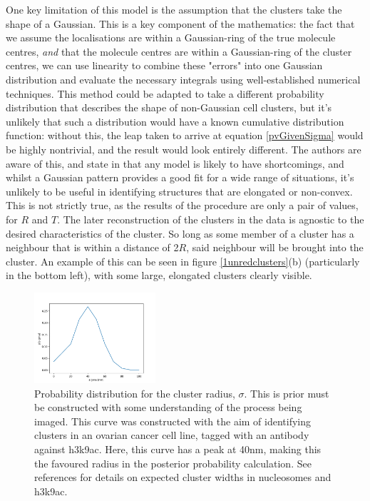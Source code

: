 \documentclass[11pt]{article}
\begin{document}
One key limitation of this model is the assumption that the clusters take the shape of a Gaussian. This is a key component of the mathematics: the fact that we assume the localisations are within a Gaussian-ring of the true molecule centres, \textit{and} that the molecule centres are within a Gaussian-ring of the cluster centres, we can use linearity to combine these "errors" into one Gaussian distribution and evaluate the necessary integrals using well-established numerical techniques. This method could be adapted to take a different probability distribution that describes the shape of non-Gaussian cell clusters, but it's unlikely that such a distribution would have a known cumulative distribution function: without this, the leap taken to arrive at equation \ref{pvGivenSigma} would be highly nontrivial, and the result would look entirely different. The authors are aware of this, and state in \cite{griffie2016bayesian} that any model is likely to have shortcomings, and whilst a Gaussian pattern provides a good fit for a wide range of situations, it's unlikely to be useful in identifying structures that are elongated or non-convex. This is not strictly true, as the results of the procedure are only a pair of values, for $R$ and $T$. The later reconstruction of the clusters in the data is agnostic to the desired characteristics of the cluster. So long as some member of a cluster has a neighbour that is within a distance of 2$R$, said neighbour will be brought into the cluster. An example of this can be seen in figure \ref{1unredclusters}(b) (particularly in the bottom left), with some large, elongated clusters clearly visible. \\



\begin{figure}
\centering
\includegraphics[width=0.4\textwidth]{figs/priorDistSigma.png}
\caption{Probability distribution for the cluster radius, $\sigma$. This is prior must be constructed with some understanding of the process being imaged. This curve was constructed with the aim of identifying clusters in an ovarian cancer cell line, tagged with an antibody against h3k9ac.
Here, this curve has a peak at 40nm, making this the favoured radius in the posterior probability calculation. See references \cite{ricci2015chromatin,xu2018super} for details on expected cluster widths in nucleosomes and h3k9ac.}
\label{fig:my_label}
\end{figure}
\end{document}
